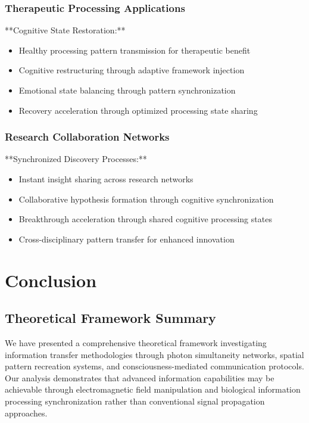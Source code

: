 \documentclass[12pt,a4paper]{article}
\begin{document}
\subsubsection{Therapeutic Processing Applications}

**Cognitive State Restoration:**
\begin{itemize}
\item Healthy processing pattern transmission for therapeutic benefit
\item Cognitive restructuring through adaptive framework injection
\item Emotional state balancing through pattern synchronization
\item Recovery acceleration through optimized processing state sharing
\end{itemize}

\subsubsection{Research Collaboration Networks}

**Synchronized Discovery Processes:**
\begin{itemize}
\item Instant insight sharing across research networks
\item Collaborative hypothesis formation through cognitive synchronization
\item Breakthrough acceleration through shared cognitive processing states
\item Cross-disciplinary pattern transfer for enhanced innovation
\end{itemize}

\section{Conclusion}

\subsection{Theoretical Framework Summary}

We have presented a comprehensive theoretical framework investigating information transfer methodologies through photon simultaneity networks, spatial pattern recreation systems, and consciousness-mediated communication protocols. Our analysis demonstrates that advanced information capabilities may be achievable through electromagnetic field manipulation and biological information processing synchronization rather than conventional signal propagation approaches.
\end{document}
